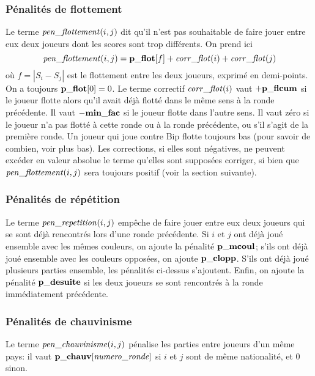 \documentclass[10pt]{article}
\begin{document}
\subsubsection{P\'enalit\'es de flottement}	
	Le terme ${\it pen\_flottement}(i,j)$ dit qu'il n'est pas
souhaitable de faire jouer entre eux deux joueurs dont les scores sont
trop diff\'erents.  On prend ici
 $${\it pen\_flottement}(i,j) =
    {\bf p\_flot}[f] + {\it corr\_flot}(i) + {\it corr\_flot}(j)
 $$
o\`u $f=\left| S_i-S_j \right|$ est le flottement entre les deux
joueurs, exprim\'e en demi-points.  On a toujours ${\bf p\_flot}[0]=0$.
Le terme correctif ${\it corr\_flot}(i)$ vaut $+{\bf p\_flcum}$ si le
joueur flotte alors qu'il avait d\'ej\`a flott\'e dans le m\^eme sens
\`a la ronde pr\'ec\'edente.  Il vaut $-{\bf min\_fac}$ si le joueur
flotte dans l'autre sens.  Il vaut z\'ero si le joueur n'a pas flott\'e
\`a cette ronde ou \`a la ronde pr\'ec\'edente, ou s'il s'agit de la
premi\`ere ronde.  Un joueur qui joue contre Bip flotte toujours bas
(pour savoir de combien, voir plus bas). Les corrections, si elles sont
n\'egatives, ne peuvent exc\'eder en valeur absolue le terme qu'elles
sont suppos\'ees corriger, si bien que ${\it pen\_flottement}(i,j)$ sera
toujours positif (voir la section suivante).


\subsubsection{P\'enalit\'es de r\'ep\'etition} 	
	Le terme ${\it pen\_repetition}(i,j)$ emp\^eche de faire jouer
entre eux deux joueurs qui se sont d\'ej\`a rencontr\'es lors d'une
ronde pr\'ec\'edente.  Si $i$ et $j$ ont d\'ej\`a jou\'e ensemble avec
les m\^emes couleurs, on ajoute la p\'enalit\'e $\bf p\_mcoul$; s'ils
ont d\'ej\`a jou\'e ensemble avec les couleurs oppos\'ees, on ajoute
$\bf p\_clopp$.  S'ils ont d\'ej\`a jou\'e plusieurs parties ensemble,
les p\'enalit\'es ci-dessus s'ajoutent.  Enfin, on ajoute la
p\'enalit\'e $\bf p\_desuite$ si les deux joueurs se sont rencontr\'es
\`a la ronde imm\'ediatement pr\'ec\'edente. 


\subsubsection{P\'enalit\'es de chauvinisme}  	
	Le terme ${\it pen\_chauvinisme}(i,j)$ p\'enalise les parties
entre joueurs d'un m\^eme pays: il vaut ${\bf p\_chauv}[{\it
numero\_ronde}]$ si $i$ et $j$ sont de m\^eme nationalit\'e, et $0$
sinon.
\end{document}
